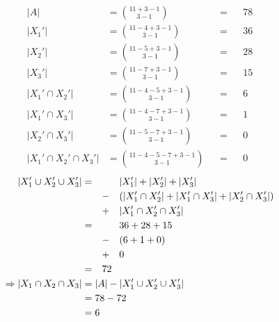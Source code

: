 \begin{PROBLEM}
{        \begin{align*}
          |A| &= \binom{11+3-1}{3-1} &&=&& 78 \\
          |X_1'| &= \binom{11-4+3-1}{3-1} &&=&& 36\\ 
          |X_2'| &= \binom{11-5+3-1}{3-1} &&=&& 28 \\
          |X_3'| &= \binom{11-7+3-1}{3-1} &&=&& 15 \\
          |X_1' \cap X_2'| &= \binom{11-4-5+3-1}{3-1} &&=&& 6 \\
          |X_1' \cap X_3'| &= \binom{11-4-7+3-1}{3-1} &&=&& 1 \\
          |X_2' \cap X_3'| &= \binom{11-5-7+3-1}{3-1} &&=&& 0 \\
          |X_1' \cap X_2' \cap X_3'| &= \binom{11-4-5-7+3-1}{3-1} &&=&& 0 
        \end{align*}
        \begin{align*}
          |X_1' \cup X_2' \cup X_3'| &=&& &&|X_1'| + |X_2'| + |X_3'|\\
          &&& - &&(|X_1' \cap X_2'| + |X_1' \cap X_3'| + |X_2' \cap X_3'|)\\
          &&& + &&|X_1' \cap X_2' \cap X_3'|\\
          &=&& &&36 + 28 + 15 \\
          &&& - &&(6 + 1 + 0)\\
          &&& + &&0 \\
          &=&& 72 \span\span\\
          \Rightarrow |X_1 \cap X_2 \cap X_3| &= |A| - |X_1' \cup X_2' \cup X_3'| \span\span\span\span \\
          &= 78 - 72\span\span\span\span\\ 
          &= 6\span\span\span\span
        \end{align*}

    }
  
\end{PROBLEM}